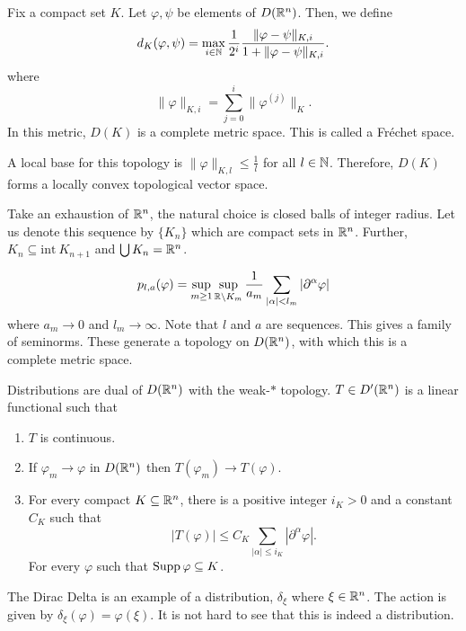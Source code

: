 Fix a compact set $K$. Let $\varphi, \psi$ be elements of $D(\mathbb{R}^n)$. Then, we define 
\begin{equation*}
    d_K(\varphi, \psi) = \max_{i\in\mathbb{N}}\frac{1}{2^i}\frac{\|\varphi - \psi\|_{K, i}}{1 + \|\varphi - \psi\|_{K, i}}.
\end{equation*}
where 
\begin{equation*}
    \|\varphi\|_{K, i} = \sum_{j = 0}^{i} \|\varphi^{(j)}\|_K.
\end{equation*}
In this metric, $D(K)$ is a complete metric space. This is called a Fr\'echet space.

A local base for this topology is $\|\varphi\|_{K, l}\le\frac{1}{l}$ for all $l\in\mathbb{N}$. Therefore, $D(K)$ forms a locally convex topological vector space.

\hrulefill 

Take an exhaustion of $\mathbb{R}^n$, the natural choice is closed balls of integer radius. Let us denote this sequence by $\{K_n\}$ which are compact sets in $\mathbb{R}^n$. Further, $K_n\subseteq\mathrm{int}~K_{n + 1}$ and $\bigcup K_n = \mathbb{R}^n$.

\begin{equation*}
    p_{l, a}(\varphi) = \sup_{m\ge 1}\sup_{\mathbb{R}\backslash K_m}\frac{1}{a_m}\sum_{|\alpha| < l_m}|\partial^\alpha\varphi|
\end{equation*}
where $a_m\to 0$ and $l_m\to\infty$. Note that $l$ and $a$ are sequences. This gives a family of seminorms. These generate a topology on $D(\mathbb{R}^n)$, with which this is a complete metric space.

\hrulefill 

Distributions are dual of $D(\mathbb{R}^n)$ with the weak-$\ast$ topology. $T\in D'(\mathbb{R}^n)$ is a linear functional such that 
\begin{enumerate}
    \item $T$ is continuous.
    \item If $\varphi_m\to\varphi$ in $D(\mathbb{R}^n)$ then $T(\varphi_m)\to T(\varphi)$.
    \item For every compact $K\subseteq\mathbb{R}^n$, there is a positive integer $i_K > 0$ and a constant $C_K$ such that 
    \begin{equation*}
        |T(\varphi)|\le C_K\sum_{|\alpha|\le i_K}|\partial^\alpha\varphi|.
    \end{equation*}
    For every $\varphi$ such that $\operatorname{Supp}\varphi\subseteq K$. 
\end{enumerate}

\begin{example}
    The Dirac Delta is an example of a distribution, $\delta_\xi$ where $\xi\in\mathbb{R}^n$. The action is given by $\delta_\xi(\varphi) = \varphi(\xi)$. It is not hard to see that this is indeed a distribution.
\end{example}

